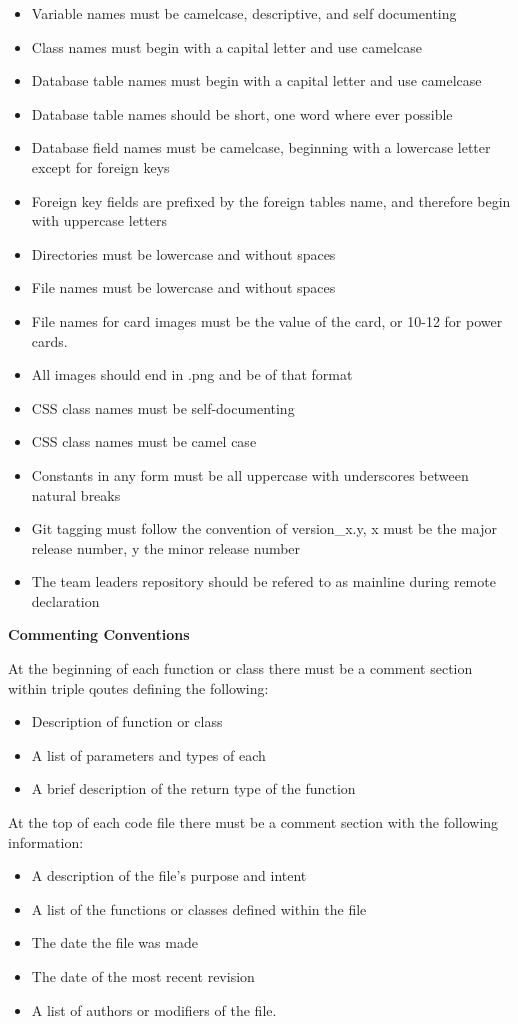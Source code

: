 \documentclass[12pt]{IEEEtran}
\begin{document}
	\begin{itemize}
		\item Variable names must be camelcase, descriptive, and self documenting
		\item Class names must begin with a capital letter and use camelcase 
		\item Database table names must begin with a capital letter and use camelcase
		\item Database table names should be short, one word where ever possible
		\item Database field names must be camelcase, beginning with a lowercase letter except for foreign keys
		\item Foreign key fields are prefixed by the foreign tables name, and therefore begin with uppercase letters
		\item Directories must be lowercase and without spaces
		\item File names must be lowercase and without spaces
		\item File names for card images must be the value of the card, or 10-12 for power cards.
		\item All images should end in .png and be of that format
		\item CSS class names must be self-documenting
		\item CSS class names must be camel case
		\item Constants in any form must be all uppercase with underscores between natural breaks
		\item Git tagging must follow the convention of version\_x.y, x must be the major release number, y the minor release number
		\item The team leaders repository should be refered to as mainline during remote declaration
	\end{itemize}

	\bfseries Commenting Conventions \mdseries

	At the beginning of each function or class there must be a comment section within triple qoutes defining the following:
	\begin{itemize}
		\item Description of function or class
		\item A list of parameters and types of each
		\item A brief description of the return type of the function
	\end{itemize}

	At the top of each code file there must be a comment section with the following information:
	\begin{itemize}
		\item A description of the file's purpose and intent
		\item A list of the functions or classes defined within the file
		\item The date the file was made
		\item The date of the most recent revision
		\item A list of authors or modifiers of the file. 
	\end{itemize}
\end{document}
